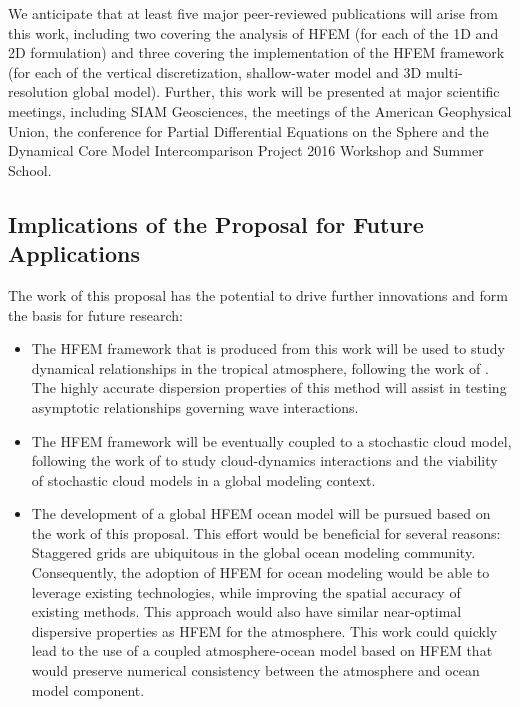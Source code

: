 \documentclass[11pt]{article}
\begin{document}
We anticipate that at least five major peer-reviewed publications will arise from this work, including two covering the analysis of HFEM (for each of the 1D and 2D formulation) and three covering the implementation of the HFEM framework (for each of the vertical discretization, shallow-water model and 3D multi-resolution global model). Further, this work will be presented at major scientific meetings, including SIAM Geosciences, the meetings of the American Geophysical Union, the conference for Partial Differential Equations on the Sphere and the Dynamical Core Model Intercomparison Project 2016 Workshop and Summer School.

\subsection{Implications of the Proposal for Future Applications} \label{sec:FutureWork}

The work of this proposal has the potential to drive further innovations and form the basis for future research:

\begin{itemize}
\item The HFEM framework that is produced from this work will be used to study dynamical relationships in the tropical atmosphere, following the work of \cite{JABAJM2005JAS,JABAJM2010CMS,JABAJM2012JAS}.  The highly accurate dispersion properties of this method will assist in testing asymptotic relationships governing wave interactions.

\item The HFEM framework will be eventually coupled to a stochastic cloud model, following the work of \cite{BKYHJAB2005JAS,BMKJABAJM2010CMS} to study cloud-dynamics interactions and the viability of stochastic cloud models in a global modeling context.

\item The development of a global HFEM ocean model will be pursued based on the work of this proposal.  This effort would be beneficial for several reasons:  Staggered grids are ubiquitous in the global ocean modeling community.  Consequently, the adoption of HFEM for ocean modeling would be able to leverage existing technologies, while improving the spatial accuracy of existing methods.  This approach would also have similar near-optimal dispersive properties as HFEM for the atmosphere.  This work could quickly lead to the use of a coupled atmosphere-ocean model based on HFEM that would preserve numerical consistency between the atmosphere and ocean model component.
\end{itemize}

%

{\vbox{}}
\end{document}
